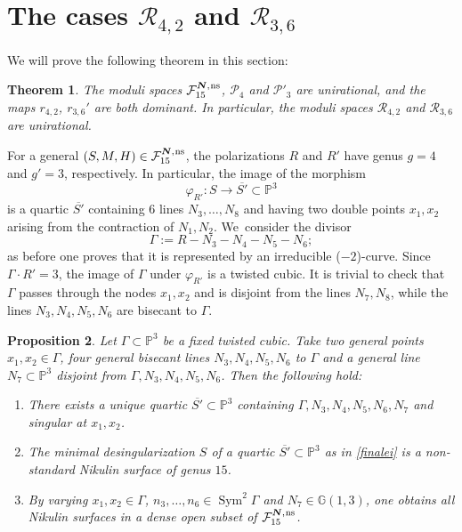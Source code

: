 \documentclass[JEP,XML,SOM,Unicode,NoEqCountersInSection,published]{cedram}
\newcommand{\ns}{{\mkern1mu\mathrm{ns}}}
\newcommand{\bN}{\boldsymbol{N}}
\theoremstyle{plain}
\newtheorem{thm}{Theorem}[section]
\newtheorem{prop}[thm]{Proposition}
\theoremstyle{definition}
\DeclareMathOperator{\Sym}{Sym}
\newcommand\GG{{\mathbb G}}
\newcommand\PP{{\mathbb P}}
\newcommand\F{{\mathcal F}}
\renewcommand\P{{\mathcal P}}
\newcommand\R{{\mathcal R}}
\begin{document}
\section{The cases \texorpdfstring{$\R_{4,2}$ and $\R_{3,6}$}{R}}

We will prove the following theorem in this section:

\begin{thm}\label{brevetto}
The moduli spaces $\F_{15}^{\bN,\ns}$, $\P_4$ and $\P'_{3}$ are unirational, and the maps $r_{4,2}$, $r_{3,6}'$ are both dominant. In particular, the moduli spaces $\R_{4,2}$ and $\R_{3,6}$ are unirational.
\end{thm}
For a general $(S,M,H)\in \F_{15}^{\bN,\ns}$, the polarizations $R$ and $R'$ have genus $g=4$ and $g'=3$, respectively. In particular, the image of the morphism
\[
\varphi_{R'}:S\to \overline{S'}\subset \mathbb P^3
\]
is a quartic $\overline{S'}$ containing $6$ lines $N_3,\ldots,N_8$ and having two double points $x_1,x_2$ arising from the contraction of $N_1,N_2$. We~consider the divisor
\[
\Gamma:=R-N_3-N_4-N_5-N_6;
\]
as before one proves that it is represented by an irreducible ($-2$)-curve. Since $\Gamma\cdot R'=3$, the image of $\Gamma$ under $\varphi_{R'}$ is a twisted cubic. It is trivial to check that $\Gamma$ passes through the nodes $x_1,x_2$ and is disjoint from the lines $N_7,N_8$, while the lines $N_3,N_4,N_5,N_6$ are bisecant to $\Gamma$.

\begin{prop}\label{finale}
Let $\Gamma\subset \PP^3$ be a fixed twisted cubic. Take two general points $x_1,x_2\in \Gamma$, four general bisecant lines $N_3,N_4,N_5,N_6$ to $\Gamma$ and a general line $N_7\subset\PP^3$ disjoint from $\Gamma,N_3,N_4,N_5,N_6$. Then the following hold:
\begin{enumerate}
\item\label{finalei}
There exists a unique quartic $\overline{S'}\subset\mathbb P^3$ containing $\Gamma,N_3,N_4,N_5,N_6,N_7$ and singular at $x_1,x_2$.
\item\label{finaleii}
The minimal desingularization $S$ of a quartic $\overline{S'}\subset\mathbb P^3$ as in \eqref{finalei} is a non-standard Nikulin surface of genus $15$.
\item\label{finaleiii}
By varying $x_1,x_2\in \Gamma$, $n_3,\ldots, n_6\in \Sym^2\Gamma$ and $N_7\in \GG(1,3)$, one obtains all Nikulin surfaces in a dense open subset of $\F_{15}^{\bN,\ns}$.
\end{enumerate}
\end{prop}
\end{document}
